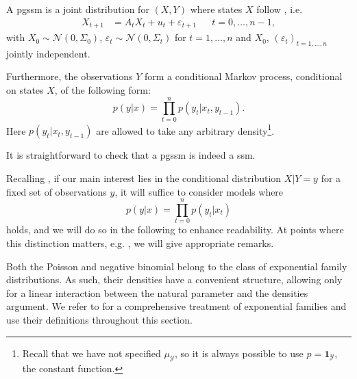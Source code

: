 \begin{definition}
    A \acrfull{pgssm} is a joint distribution for $(X,Y)$ where states $X$ follow , i.e. 
    \begin{align*}
        X_{t + 1}  &= A_{t}X_{t} + u_{t} + \varepsilon_{t + 1} &  & t = 0, \dots, n - 1,
    \end{align*}
    with $X_{0} \sim \mathcal N(0, \Sigma_{0})$, $\varepsilon_{t} \sim \mathcal N (0, \Sigma_{t})$ for $t = 1, \dots, n$ and $X_{0}$, $(\varepsilon_{t})_{t = 1, \dots, n}$ jointly independent. 

    Furthermore, the observations $Y$ form a conditional Markov process, conditional on states $X$, of the following form:
    $$
    p(y | x) = \prod_{t = 0}^n p(y_{t} | x_{t}, y_{t - 1}).
    $$
    Here $p(y_{t} | x_{t}, y_{t -1})$ are allowed to take any arbitrary density\footnote{Recall that we have not specified $\mu_{\mathcal Y}$, so it is always possible to use $p = \mathbf 1 _{\mathcal Y}$, the constant function.}.
\end{definition}

It is straightforward to check that a \acrshort{pgssm} is indeed a \acrshort{ssm}. 

\begin{remark}
    Recalling , if our main interest lies in the conditional distribution $X|Y = y$ for a fixed set of observations $y$, it will suffice to consider models where 
    $$
    p(y | x) = \prod_{t = 0}^n p(y_{t} | x_{t})
    $$
    holds, and we will do so in the following to enhance readability. At points where this distinction matters, e.g. , we will give appropriate remarks.
\end{remark}

Both the Poisson and negative binomial belong to the class of exponential family distributions. As such, their densities have a convenient structure, allowing only for a linear interaction between the natural parameter and the densities argument. We refer to \citep{Brown1986Fundamentals} for a comprehensive treatment of exponential families and use their definitions throughout this section.

